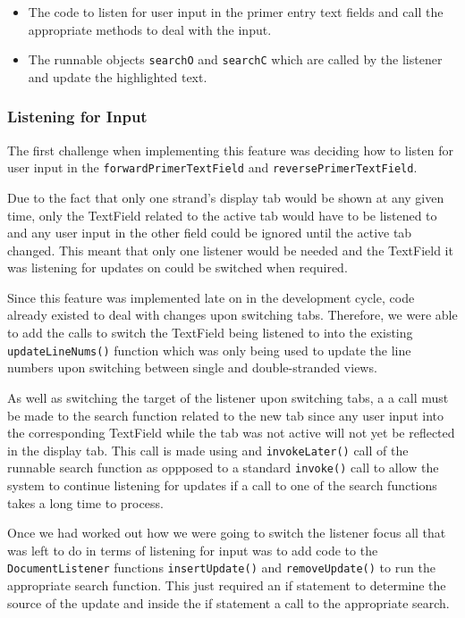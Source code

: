 \begin{itemize}
\item The code to listen for user input in the primer entry text fields
and call the appropriate methods to deal with the input.
\item The runnable objects \texttt{searchO} and \texttt{searchC} which
are called by the listener and update the highlighted text.
\end{itemize}

\subsubsection{Listening for Input}

The first challenge when implementing this feature was deciding how to
listen for user input in the \texttt{forwardPrimerTextField} and
\texttt{reversePrimerTextField}.

Due to the fact that only one strand's display tab would be shown at any
given time, only the TextField related to the active tab would have to
be listened to and any user input in the other field could be ignored
until the active tab changed. This meant that only one listener would be
needed and the TextField it was listening for updates on could be
switched when required.

Since this feature was implemented late on in the development cycle,
code already existed to deal with changes upon switching tabs.
Therefore, we were able to add the calls to switch the TextField being
listened to into the existing \texttt{updateLineNums()} function which
was only being used to update the line numbers upon switching between
single and double-stranded views.

As well as switching the target of the listener upon switching tabs, a
a call must be made to the search function related to the new tab
since any user input into the corresponding TextField while the tab was
not active will not yet be reflected in the display tab. This call is
made using and \texttt{invokeLater()} call of the runnable search
function as oppposed to a standard \texttt{invoke()} call to allow the
system to continue listening for updates if a call to one of the search
functions takes a long time to process.

Once we had worked out how we were going to switch the listener focus
all that was left to do in terms of listening for input was to add code
to the \texttt{DocumentListener} functions
\texttt{insert\-Update()} and \texttt{removeUpdate()} to run the
appropriate search function. This just required an if statement to
determine the source of the update and inside the if statement a call to
the appropriate search.

